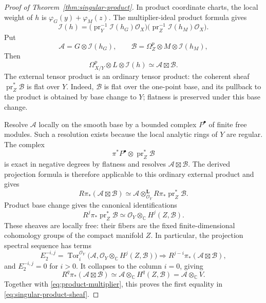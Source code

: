 \documentclass[11pt,reqno]{amsart}
\numberwithin{equation}{section}
\theoremstyle{definition}
\theoremstyle{remark}
\begin{document}
\begin{proof}[Proof of Theorem~\ref{thm:singular-product}]
In product coordinate charts, the local weight of $h$ is
$\varphi_G(y)+\varphi_M(z)$.  The multiplier-ideal product formula
\cite[Theorem~2.6(i)]{DEL00} gives
\begin{equation}\label{eq:product-multiplier}
 \mathcal I(h)=
 \bigl(\operatorname{pr}_Y^{-1}\mathcal I(h_G)\mathcal O_X\bigr)
 \bigl(\operatorname{pr}_Z^{-1}\mathcal I(h_M)\mathcal O_X\bigr).
\end{equation}
Put
\[
 \mathcal A=G\otimes\mathcal I(h_G),\qquad
 \mathcal B=\Omega_Z^p\otimes M\otimes\mathcal I(h_M),
\]
Then
\[
 \Omega_{X/Y}^p\otimes L\otimes\mathcal I(h)
       \simeq\mathcal A\boxtimes\mathcal B.
\]
The external tensor product is an ordinary tensor product: the
coherent sheaf $\operatorname{pr}_Z^*\mathcal B$ is flat over $Y$.
Indeed, $\mathcal B$ is flat over the one-point base, and its pullback
to the product is obtained by base change to $Y$; flatness is preserved
under this base change.

Resolve $\mathcal A$ locally on the smooth base by a
bounded complex $P^\bullet$ of finite free modules.  Such a resolution
exists because the local analytic rings of $Y$ are regular.
The complex
\[
 \pi^*P^\bullet\otimes\operatorname{pr}_Z^*\mathcal B
\]
is exact in negative degrees by flatness and resolves
$\mathcal A\boxtimes\mathcal B$.
The derived projection formula is therefore applicable to this
ordinary external product and gives
\[
 R\pi_*(\mathcal A\boxtimes\mathcal B)
 \simeq\mathcal A\otimes^{\mathbf L}_{\mathcal O_Y}
             R\pi_*\operatorname{pr}_Z^*\mathcal B.
\]
Product base change gives the canonical identifications
\[
 R^j\pi_*\operatorname{pr}_Z^*\mathcal B
       \simeq\mathcal O_Y\otimes_{\mathbb C}H^j(Z,\mathcal B).
\]
These sheaves are locally free: their fibers are the fixed
finite-dimensional cohomology groups of the compact manifold $Z$.
In particular, the projection spectral sequence has terms
\[
 E_2^{-i,j}=\operatorname{Tor}^{\mathcal O_Y}_i
 \bigl(\mathcal A,
       \mathcal O_Y\otimes_{\mathbb C}H^j(Z,\mathcal B)\bigr)
 \Longrightarrow
 R^{j-i}\pi_*(\mathcal A\boxtimes\mathcal B),
\]
and $E_2^{-i,j}=0$ for $i>0$.  It collapses to the column $i=0$,
giving
\[
 R^q\pi_*(\mathcal A\boxtimes\mathcal B)
       \simeq\mathcal A\otimes_{\mathbb C}H^q(Z,\mathcal B)
       =\mathcal A\otimes_{\mathbb C}V.
\]
Together with \eqref{eq:product-multiplier}, this proves the first
equality in \eqref{eq:singular-product-sheaf}.


\end{proof}
\end{document}
